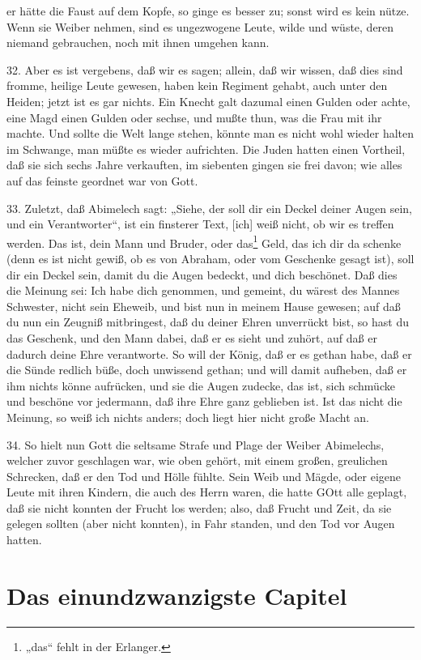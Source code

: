 er hätte die Faust auf dem Kopfe, so ginge es besser zu; sonst wird es kein nütze. Wenn sie Weiber nehmen, sind es ungezwogene Leute, wilde und wüste, deren niemand gebrauchen, noch mit ihnen umgehen kann.

32. Aber es ist vergebens, daß wir es sagen; allein, daß wir wissen, daß dies sind fromme, heilige Leute gewesen, haben kein Regiment gehabt, auch unter den Heiden; jetzt ist es gar nichts. Ein Knecht galt dazumal einen Gulden oder achte, eine Magd einen Gulden oder sechse, und mußte thun, was die Frau mit ihr machte. Und sollte die Welt lange stehen, könnte man es nicht wohl wieder halten im Schwange, man müßte es wieder aufrichten. Die Juden hatten einen Vortheil, daß sie sich sechs Jahre verkauften, im siebenten gingen sie frei davon; wie alles auf das feinste geordnet war von Gott.

33. Zuletzt, daß Abimelech sagt: „Siehe, der soll dir ein Deckel deiner Augen sein, und ein Verantworter“, ist ein finsterer Text, [ich] weiß nicht, ob wir es treffen werden. Das ist, dein Mann und Bruder, oder das\footnote{„das“ fehlt in der Erlanger.} Geld, das ich dir da schenke (denn es ist nicht gewiß, ob es von Abraham, oder vom Geschenke gesagt ist), soll dir ein Deckel sein, damit du die Augen bedeckt, und dich beschönet. Daß dies die Meinung sei: Ich habe dich genommen, und gemeint, du wärest des Mannes Schwester, nicht sein Eheweib, und bist nun in meinem Hause gewesen; auf daß du nun ein Zeugniß mitbringest, daß du deiner Ehren unverrückt bist, so hast du das Geschenk, und den Mann dabei, daß er es sieht und zuhört, auf daß er dadurch deine Ehre verantworte. So will der König, daß er es gethan habe, daß er die Sünde redlich büße, doch unwissend gethan; und will damit aufheben, daß er ihm nichts könne aufrücken, und sie die Augen zudecke, das ist, sich schmücke und beschöne vor jedermann, daß ihre Ehre ganz geblieben ist. Ist das nicht die Meinung, so weiß ich nichts anders; doch liegt hier nicht große Macht an.

34. So hielt nun Gott die seltsame Strafe und Plage der Weiber Abimelechs, welcher zuvor geschlagen war, wie oben gehört, mit einem großen, greulichen Schrecken, daß er den Tod und Hölle fühlte. Sein Weib und Mägde, oder eigene Leute mit ihren Kindern, die auch des Herrn waren, die hatte GOtt alle geplagt, daß sie nicht konnten der Frucht los werden; also, daß Frucht und Zeit, da sie gelegen sollten (aber nicht konnten), in Fahr standen, und den Tod vor Augen hatten.

\section{Das einundzwanzigste Capitel}


